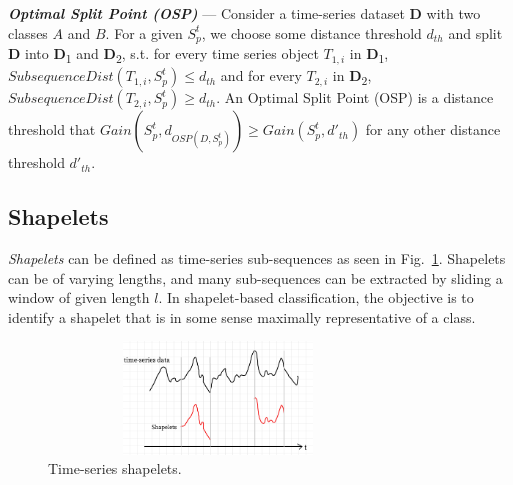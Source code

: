 \documentclass[conference]{IEEEtran}  %
\begin{document}
\enlargeeup
\noindent
\textbf{\textit{Optimal Split Point (OSP)}} --- Consider a time-series dataset \textbf{D} with two classes $A$ and $B$. For a given $S^t_p$, we choose some distance threshold $d_{th}$ and split \textbf{D} into \textbf{D}\textsubscript{1} and \textbf{D}\textsubscript{2}, s.t. for every time series object $T_{1,i}$ in \textbf{D}\textsubscript{1}, $SubsequenceDist(T_{1,i}, S^t_p) \leq d_{th}$ and for every $T_{2,i}$ in \textbf{D}\textsubscript{2}, $SubsequenceDist(T_{2,i}, S^t_p) \geq d_{th}$. An Optimal Split Point (OSP) is a distance threshold that $Gain(S^t_p,d_{OSP(D,S^t_p)}) \geq Gain(S^t_p,d'_{th})$ for any other distance threshold $d'_{th}$.

\subsection{Shapelets}
\textit{Shapelets} can be defined as time-series sub-sequences as seen in Fig.~\ref{fig:shapelets}. 
Shapelets can be of varying lengths, and many sub-sequences can be extracted by sliding a window of given length $l$. In shapelet-based classification, the objective is to identify a shapelet that is in some sense maximally representative of a class.

\begin{figure}
\includegraphics[width=9cm,height=3cm]{shapelet1.png}
\caption{Time-series shapelets.}
\label{fig:shapelets}
\end{figure}
\end{document}
